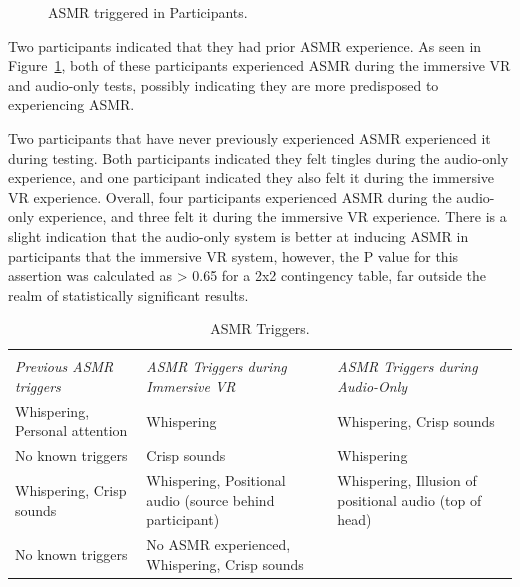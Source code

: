 \documentclass{sigchi}
\begin{document}
\begin{figure}[htb]
\centering
{}
\caption{ASMR triggered in Participants.}
\label{fig:experienced_asmr}
\end{figure}

Two participants indicated that they had prior ASMR experience. As seen in Figure~\ref{fig:experienced_asmr}, both of these participants experienced ASMR during the immersive VR and audio-only tests, possibly indicating they are more predisposed to experiencing ASMR. 

Two participants that have never previously experienced ASMR experienced it during testing. Both participants indicated they felt tingles during the audio-only experience, and one participant indicated they also felt it during the immersive VR experience. Overall, four participants experienced ASMR during the audio-only experience, and three felt it during the immersive VR experience. There is a slight indication that the audio-only system is better at inducing ASMR in participants that the immersive VR system, however, the P value for this assertion was calculated as > 0.65 for a 2x2 contingency table, far outside the realm of statistically significant results.

\begin{table}[htb]
  \centering
  \begin{tabular}{p{6cm} p{6cm} p{6cm}}
    \toprule\\
    {\textit{Previous ASMR triggers}} & {\textit{ASMR Triggers during Immersive VR}} & {\textit{ASMR Triggers during Audio-Only}}\\
    \midrule
    Whispering, Personal attention & Whispering & Whispering, Crisp sounds \\
    No known triggers & Crisp sounds & Whispering \\
    Whispering, Crisp sounds & Whispering, Positional audio (source behind participant) & Whispering, Illusion of positional audio (top of head)\\
    No known triggers & No ASMR experienced, Whispering, Crisp sounds\\
     \bottomrule
  \end{tabular}
  \caption{ASMR Triggers.}~\label{tab:triggers}
\end{table}
\end{document}
